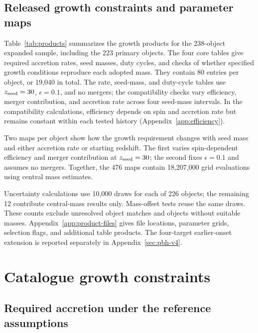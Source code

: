 \documentclass[pdflatex,sn-basic]{sn-jnl}
\begin{document}
\subsection{Released growth constraints and parameter maps}
\label{sec:products}

Table~\ref{tab:products} summarizes the growth products for the 238-object
expanded sample, including the 223 primary objects. The four core tables
give required accretion rates, seed masses, duty cycles, and checks of
whether specified growth conditions reproduce each adopted mass. They
contain 80 entries per object, or 19,040 in total. The rate, seed-mass, and
duty-cycle tables use $z_{\rm seed}=30$, $\epsilon=0.1$, and no mergers;
the compatibility checks vary efficiency, merger contribution, and accretion
rate across four seed-mass intervals. In the compatibility calculations, efficiency depends
on spin and accretion rate but remains constant within each tested history
(Appendix~\ref{app:efficiency}).


Two maps per object show how the growth requirement changes with seed mass
and either accretion rate or starting redshift. The first varies spin-dependent
efficiency and merger contribution at $z_{\rm seed}=30$; the second fixes
$\epsilon=0.1$ and assumes no mergers. Together, the 476 maps contain
18,207,000 grid evaluations using central mass estimates.

Uncertainty calculations use 10,000 draws for each of 226 objects; the
remaining 12 contribute central-mass results only. Mass-offset tests reuse
the same draws. These counts exclude unresolved object matches and objects
without suitable masses.
Appendix~\ref{app:product-files} gives file locations, parameter grids,
selection flags, and additional table products. The four-target earlier-onset
extension is reported separately in Appendix~\ref{sec:pbh-v4}.

\FloatBarrier
\section{Catalogue growth constraints}

\subsection{Required accretion under the reference assumptions}
\end{document}
